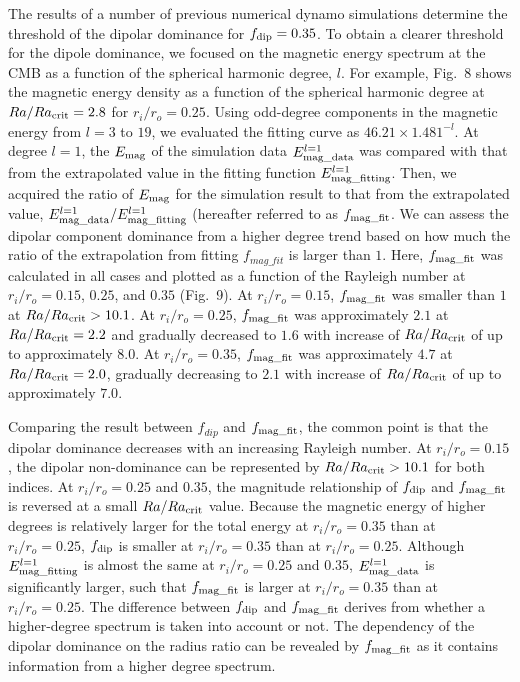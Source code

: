 The results of a number of previous numerical dynamo simulations determine the threshold of the dipolar dominance for $f_{\rm dip} = 0.35$. 
To obtain a clearer threshold for the dipole dominance, we focused on the magnetic energy spectrum at the CMB as a function of the spherical harmonic degree, $l$. 
For example, Fig.~8 shows the magnetic energy density as a function of the spherical harmonic degree at $Ra/Ra_{\rm crit} = 2.8$ for $r_i/r_o = 0.25$. 
Using odd-degree components in the magnetic energy from $l = 3$ to $19$, we evaluated the fitting curve as $46.21 \times 1.481^{-l}$. 
At degree $l = 1$, the $E_{\rm mag}$ of the simulation data $E_{\rm mag\_data}^{l = 1}$ was compared with that from the extrapolated value in the fitting function $E_{\rm mag\_fitting}^{l = 1}$. 
Then, we acquired the ratio of $E_{\rm mag}$ for the simulation result to that from the extrapolated value, $E_{\rm mag\_data}^{l = 1}/E_{\rm mag\_fitting}^{l=1}$ (hereafter referred to as $f_{\rm mag\_fit}$. 
We can assess the dipolar component dominance from a higher degree trend based on how much the ratio of the extrapolation from fitting $f_{mag\_fit}$ is larger than $1$. 
Here, $f_{\rm mag\_fit}$ was calculated in all cases and plotted as a function of the Rayleigh number at $r_i/r_o = 0.15$, $0.25$, and $0.35$ (Fig.~9). 
At $r_i/r_o = 0.15$, $f_{\rm mag\_fit}$ was smaller than $1$ at $Ra/Ra_{\rm crit} > 10.1$. 
At $r_i/r_o = 0.25$, $f_{\rm mag\_fit}$ was approximately $2.1$ at $Ra/Ra_{\rm crit} = 2.2$ and gradually decreased to $1.6$ with increase of $Ra/Ra_{\rm crit}$ of up to approximately $8.0$. 
At $r_i/r_o = 0.35$, $f_{\rm mag\_fit}$ was approximately $4.7$ at $Ra/Ra_{\rm crit} = 2.0$, gradually decreasing to $2.1$ with increase of $Ra/Ra_{\rm crit}$ of up to approximately $7.0$.

Comparing the result between $f_{dip}$ and $f_{\rm mag\_fit}$, the common point is that the dipolar dominance decreases with an increasing Rayleigh number. 
At $r_i/r_o = 0.15$, the dipolar non-dominance can be represented by $Ra/Ra_{\rm crit} > 10.1$ for both indices. 
At $r_i/r_o = 0.25$ and $0.35$, the magnitude relationship of $f_{\rm dip}$ and $f_{\rm mag\_fit}$ is reversed at a small $Ra/Ra_{\rm crit}$ value. 
Because the magnetic energy of higher degrees is relatively larger for the total energy at $r_i/r_o = 0.35$ than at $r_i/r_o = 0.25$, $f_{\rm dip}$ is smaller at $r_i/r_o = 0.35$ than at $r_i/r_o = 0.25$. 
Although $E_{\rm mag\_fitting}^{l = 1}$ is almost the same at $r_i/r_o = 0.25$ and $0.35$, $E_{\rm mag\_data}^{l = 1}$ is significantly larger, such that $f_{\rm mag\_fit}$ is larger at $r_i/r_o = 0.35$ than at $r_i/r_o = 0.25$. 
The difference between $f_{\rm dip}$ and $f_{\rm mag\_fit}$ derives from whether a higher-degree spectrum is taken into account or not. 
The dependency of the dipolar dominance on the radius ratio can be revealed by $f_{\rm mag\_fit}$ as it contains information from a higher degree spectrum.

